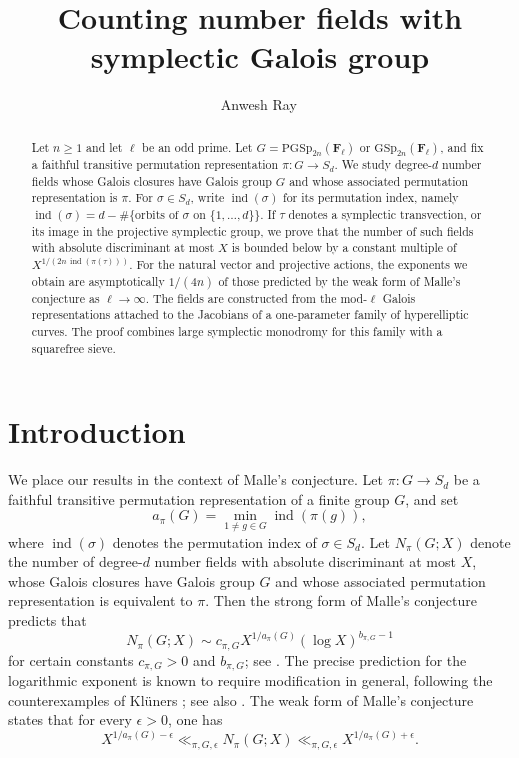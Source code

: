 \documentclass[11pt,hidelinks]{amsart}
\title[Counting symplectic Galois number fields]{Counting number fields with symplectic Galois group}
\author[A.~Ray]{Anwesh Ray\, \orcidlink{0000-0001-6946-1559}}
\newcommand{\F}{\mathbf F}
\begin{document}
\begin{abstract}
Let $n\geq 1$ and let $\ell$ be an odd prime.  Let
$G=\mathrm{PGSp}_{2n}(\F_\ell)$ or $\mathrm{GSp}_{2n}(\F_\ell)$, and fix a faithful
transitive permutation representation
$\pi:G\longrightarrow S_d$. We study degree-$d$ number fields whose
Galois closures have Galois group $G$ and whose associated permutation
representation is $\pi$. For $\sigma\in S_d$, write
$\operatorname{ind}(\sigma)$ for its permutation index, namely
$\operatorname{ind}(\sigma)
=
d-\#\{\text{orbits of $\sigma$ on $\{1,\ldots,d\}$}\}$.
If $\tau$ denotes a symplectic transvection, or its image in the
projective symplectic group, we prove that the number of such fields
with absolute discriminant at most $X$ is bounded below by a constant
multiple of
$X^{1/(2n\,\operatorname{ind}(\pi(\tau)))}$. For the natural vector and projective actions, the exponents we obtain are asymptotically $1/(4n)$ of those predicted by the weak form of Malle's conjecture as $\ell\to\infty$. The fields are constructed from the mod-$\ell$ Galois representations
attached to the Jacobians of a one-parameter family of hyperelliptic
curves. The proof combines large symplectic monodromy for this family with a
squarefree sieve.
\end{abstract}
\maketitle

\section{Introduction}\label{sec:introduction}
We place our results in the context of Malle's conjecture. Let
$\pi:G\rightarrow S_d$ be a faithful transitive permutation
representation of a finite group $G$, and set
\[
a_\pi(G)
=
\min_{1\neq g\in G}\operatorname{ind}(\pi(g)),
\]
where $\operatorname{ind}(\sigma)$ denotes the permutation index of
$\sigma\in S_d$. Let $N_\pi(G;X)$ denote the number of degree-$d$
number fields with absolute discriminant at most $X$, whose Galois
closures have Galois group $G$ and whose associated permutation
representation is equivalent to $\pi$. Then the strong form of
Malle's conjecture predicts that
\[N_\pi(G;X)\sim c_{\pi,G}X^{1/a_\pi(G)}
(\log X)^{b_{\pi,G}-1}\]
for certain constants $c_{\pi,G}>0$ and $b_{\pi,G}$; see \cite{Malle2002,Malle2004}. The precise
prediction for the logarithmic exponent is known to require
modification in general, following the counterexamples of Kl\"uners
\cite{Kluners2005}; see also \cite{Turkelli2015}. The weak form of Malle's conjecture states that for every $\epsilon>0$, one has
\[
X^{1/a_\pi(G)-\epsilon}
\ll_{\pi,G,\epsilon}
N_\pi(G;X)
\ll_{\pi,G,\epsilon}
X^{1/a_\pi(G)+\epsilon}.
\]
\end{document}
